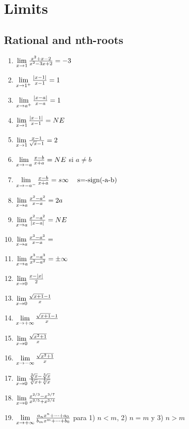 %
%
%
% 
%

\section{Limits}


\subsection{Rational and nth-roots}
\begin{enumerate}
\item  $\lim\limits_{x \rightarrow 1}  \frac{x^2+x-2}{x^2-3x+2}=-3$
\item $\lim\limits_{x \rightarrow 1^{+}}  \frac{|x-1|}{x-1}=1$
\item $\lim\limits_{x \rightarrow a^{+}}  \frac{|x-a|}{x-a}=1$
\item $\lim\limits_{x \rightarrow 1}  \frac{|x-1|}{x-1}=NE$
\item $\lim\limits_{x \rightarrow 1}  \frac{x-1}{\sqrt{x}-1}=2$
\item $\lim\limits_{x \rightarrow -a}  \frac{x-b}{x+a}=NE$ si $a \neq b$
\item $\myfraclim{x}{-a^{-}}{x-b}{x+a}=s \infty \mathcomment{s=-sign(-a-b)}$
\item $\lim\limits_{x \rightarrow a}  \frac{x^2-a^2}{x-a}=2a$
\item $\lim\limits_{x \rightarrow a}  \frac{x^2-a^2}{|x-a|}=NE$
\item $\lim\limits_{x \rightarrow a}  \frac{x^3-a^3}{x-a}= $
\item $\lim\limits_{x \rightarrow a}  \frac{x^3-a^3}{x^2-a^2}=\pm \infty$
\item $\lim\limits_{x \rightarrow 0}  \frac{x-|x|}{2}$
\item $\lim\limits_{x \rightarrow 0}  \frac{\sqrt{x+1}-1}{x}$
\item $\lim\limits_{x \rightarrow +\infty}  \frac{\sqrt{x+1}-1}{x}$

\item $\lim\limits_{x \rightarrow 0}  \frac{\sqrt{x^2+1}}{x}$

\item $\lim\limits_{x \rightarrow -\infty}  \frac{\sqrt{x^2+1}}{x}$

\item $\lim\limits_{x \rightarrow 0}  \frac{\sqrt[3]{x}-\sqrt[5]{x}}{\sqrt[3]{x}+\sqrt[5]{x}}$

\item $\lim\limits_{x \rightarrow 0}  \frac{x^{2/3}-x^{3/7}}{x^{2/5}+x^{3/4}}$

\item $\lim\limits_{x \rightarrow +\infty}  \frac{a_n x^n+ \dots +a_0}{b_m x^m+ \dots +b_0}$ para 1) $n<m$, 2) $n=m$ y 3) $n>m$

\end{enumerate}

